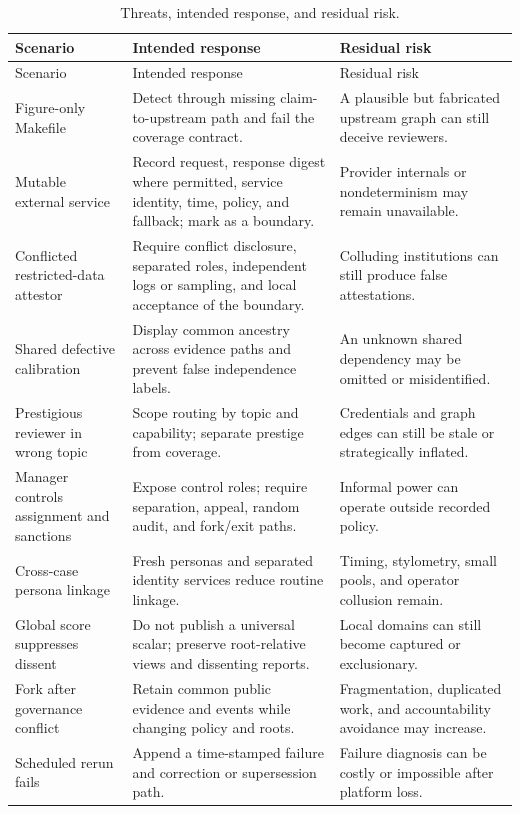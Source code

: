 \documentclass[11pt]{article}
\begin{document}
\begin{longtable}{@{}L{0.22\textwidth}L{0.18\textwidth}L{0.51\textwidth}@{}}
\caption{Threats, intended response, and residual risk.}\label{tab:threats}\\
\toprule
Scenario & Intended response & Residual risk \\
\midrule
\endfirsthead
\toprule
Scenario & Intended response & Residual risk \\
\midrule
\endhead
Figure-only Makefile & Detect through missing claim-to-upstream path and fail the coverage contract. & A plausible but fabricated upstream graph can still deceive reviewers. \\
Mutable external service & Record request, response digest where permitted, service identity, time, policy, and fallback; mark as a boundary. & Provider internals or nondeterminism may remain unavailable. \\
Conflicted restricted-data attestor & Require conflict disclosure, separated roles, independent logs or sampling, and local acceptance of the boundary. & Colluding institutions can still produce false attestations. \\
Shared defective calibration & Display common ancestry across evidence paths and prevent false independence labels. & An unknown shared dependency may be omitted or misidentified. \\
Prestigious reviewer in wrong topic & Scope routing by topic and capability; separate prestige from coverage. & Credentials and graph edges can still be stale or strategically inflated. \\
Manager controls assignment and sanctions & Expose control roles; require separation, appeal, random audit, and fork/exit paths. & Informal power can operate outside recorded policy. \\
Cross-case persona linkage & Fresh personas and separated identity services reduce routine linkage. & Timing, stylometry, small pools, and operator collusion remain. \\
Global score suppresses dissent & Do not publish a universal scalar; preserve root-relative views and dissenting reports. & Local domains can still become captured or exclusionary. \\
Fork after governance conflict & Retain common public evidence and events while changing policy and roots. & Fragmentation, duplicated work, and accountability avoidance may increase. \\
Scheduled rerun fails & Append a time-stamped failure and correction or supersession path. & Failure diagnosis can be costly or impossible after platform loss. \\
\bottomrule
\end{longtable}
\end{document}
